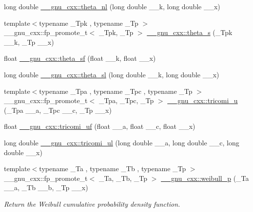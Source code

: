 \begin{DoxyCompactItemize}
\item 
long double \hyperlink{group__gnu__math__spec__func_ga907f6c147387d55d2dfccbc58d1f1bc5}{\+\_\+\+\_\+gnu\+\_\+cxx\+::theta\+\_\+nl} (long double \+\_\+\+\_\+k, long double \+\_\+\+\_\+x)
\item 
{\footnotesize template$<$typename \+\_\+\+Tpk , typename \+\_\+\+Tp $>$ }\\\+\_\+\+\_\+gnu\+\_\+cxx\+::fp\+\_\+promote\+\_\+t$<$ \+\_\+\+Tpk, \+\_\+\+Tp $>$ \hyperlink{group__gnu__math__spec__func_gaf28f2dca107531890b49cccf2bdd67be}{\+\_\+\+\_\+gnu\+\_\+cxx\+::theta\+\_\+s} (\+\_\+\+Tpk \+\_\+\+\_\+k, \+\_\+\+Tp \+\_\+\+\_\+x)
\item 
float \hyperlink{group__gnu__math__spec__func_ga5e69cf30c9a4cc057accc43e8c4bf7a3}{\+\_\+\+\_\+gnu\+\_\+cxx\+::theta\+\_\+sf} (float \+\_\+\+\_\+k, float \+\_\+\+\_\+x)
\item 
long double \hyperlink{group__gnu__math__spec__func_gac574077067a4e7b24a0a9ff2d537d885}{\+\_\+\+\_\+gnu\+\_\+cxx\+::theta\+\_\+sl} (long double \+\_\+\+\_\+k, long double \+\_\+\+\_\+x)
\item 
{\footnotesize template$<$typename \+\_\+\+Tpa , typename \+\_\+\+Tpc , typename \+\_\+\+Tp $>$ }\\\+\_\+\+\_\+gnu\+\_\+cxx\+::fp\+\_\+promote\+\_\+t$<$ \+\_\+\+Tpa, \+\_\+\+Tpc, \+\_\+\+Tp $>$ \hyperlink{group__gnu__math__spec__func_gaf51a13fad85006e4d65c5b117e49f7d8}{\+\_\+\+\_\+gnu\+\_\+cxx\+::tricomi\+\_\+u} (\+\_\+\+Tpa \+\_\+\+\_\+a, \+\_\+\+Tpc \+\_\+\+\_\+c, \+\_\+\+Tp \+\_\+\+\_\+x)
\item 
float \hyperlink{group__gnu__math__spec__func_gab6eb5ec587642bf0952d6c3df1c64904}{\+\_\+\+\_\+gnu\+\_\+cxx\+::tricomi\+\_\+uf} (float \+\_\+\+\_\+a, float \+\_\+\+\_\+c, float \+\_\+\+\_\+x)
\item 
long double \hyperlink{group__gnu__math__spec__func_gac5213af3913aeb8beb7206688889c60c}{\+\_\+\+\_\+gnu\+\_\+cxx\+::tricomi\+\_\+ul} (long double \+\_\+\+\_\+a, long double \+\_\+\+\_\+c, long double \+\_\+\+\_\+x)
\item 
{\footnotesize template$<$typename \+\_\+\+Ta , typename \+\_\+\+Tb , typename \+\_\+\+Tp $>$ }\\\+\_\+\+\_\+gnu\+\_\+cxx\+::fp\+\_\+promote\+\_\+t$<$ \+\_\+\+Ta, \+\_\+\+Tb, \+\_\+\+Tp $>$ \hyperlink{group__gnu__math__spec__func_ga9afb3065fea6ef3a91126d67f726f7af}{\+\_\+\+\_\+gnu\+\_\+cxx\+::weibull\+\_\+p} (\+\_\+\+Ta \+\_\+\+\_\+a, \+\_\+\+Tb \+\_\+\+\_\+b, \+\_\+\+Tp \+\_\+\+\_\+x)
\begin{DoxyCompactList}\small\item\em Return the Weibull cumulative probability density function. \end{DoxyCompactList}\item 

\end{DoxyCompactItemize}
